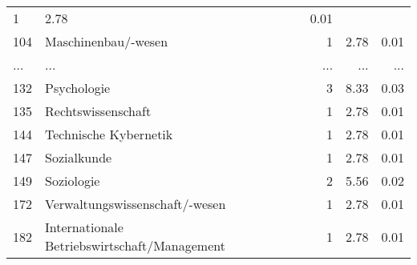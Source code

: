 \begin{longtable}{lXrrr}
          \num{1} &
          \num[round-mode=places,round-precision=2]{2.78} &
          \num[round-mode=places,round-precision=2]{0.01} \\
        104 & \multicolumn{1}{X}{Maschinenbau/-wesen} & %
          \num{1} &
          \num[round-mode=places,round-precision=2]{2.78} &
          \num[round-mode=places,round-precision=2]{0.01} \\
       ... & ... & ... & ... & ... \\
        132 & \multicolumn{1}{X}{Psychologie} & %
          \num{3} &
          \num[round-mode=places,round-precision=2]{8.33} &
          \num[round-mode=places,round-precision=2]{0.03} \\

        135 & \multicolumn{1}{X}{Rechtswissenschaft} & %
          \num{1} &
          \num[round-mode=places,round-precision=2]{2.78} &
          \num[round-mode=places,round-precision=2]{0.01} \\

        144 & \multicolumn{1}{X}{Technische Kybernetik} & %
          \num{1} &
          \num[round-mode=places,round-precision=2]{2.78} &
          \num[round-mode=places,round-precision=2]{0.01} \\

        147 & \multicolumn{1}{X}{Sozialkunde} & %
          \num{1} &
          \num[round-mode=places,round-precision=2]{2.78} &
          \num[round-mode=places,round-precision=2]{0.01} \\

        149 & \multicolumn{1}{X}{Soziologie} & %
          \num{2} &
          \num[round-mode=places,round-precision=2]{5.56} &
          \num[round-mode=places,round-precision=2]{0.02} \\

        172 & \multicolumn{1}{X}{Verwaltungswissenschaft/-wesen} & %
          \num{1} &
          \num[round-mode=places,round-precision=2]{2.78} &
          \num[round-mode=places,round-precision=2]{0.01} \\

        182 & \multicolumn{1}{X}{Internationale Betriebswirtschaft/Management} & %
          \num{1} &
          \num[round-mode=places,round-precision=2]{2.78} &
          \num[round-mode=places,round-precision=2]{0.01} \\


\end{longtable}
